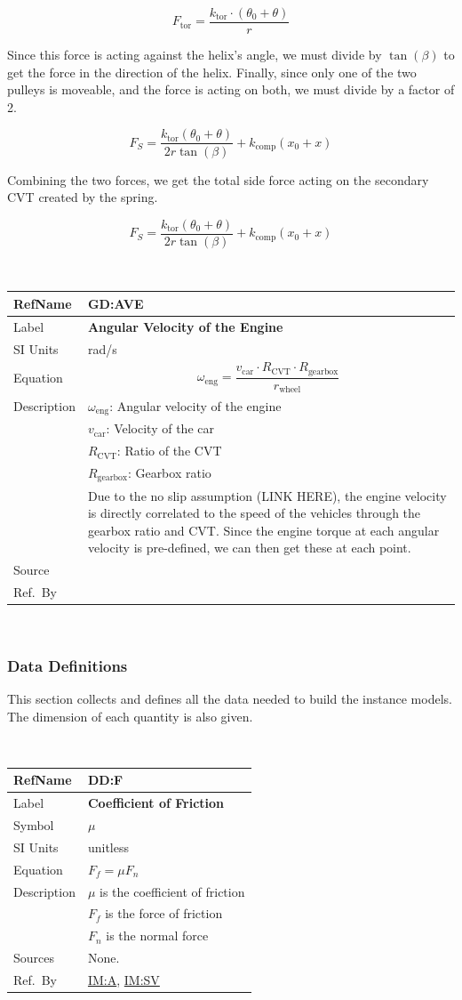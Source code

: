 \documentclass[12pt]{article}
\newcommand{\colAwidth}{0.13\textwidth}
\newcommand{\colBwidth}{0.82\textwidth}
\newcommand{\hpref}[1]{\hyperref[#1]{#1}}
\newcommand{\defgeneral}[7] {
~\newline
\noindent
\begin{minipage}{\textwidth}
\renewcommand*{\arraystretch}{1.5}
\begin{tabular}{| p{\colAwidth} | p{\colBwidth}|}
  \hline
  \rowcolor[gray]{0.9}
  RefName& \textbf{#1} \label{#1}\\
  \hline
  Label& \bf #2 \\
  \hline
  SI Units& #3\\
  \hline
  Equation& #4\\
  \hline
  Description& #5 \\
  \hline
  Source& #6 \\
  \hline
  Ref.\ By & #7\\
  \hline
\end{tabular}
\end{minipage}\\
}
\newcommand{\defdata}[8] {
~\newline
\noindent
\begin{minipage}{\textwidth}
\renewcommand*{\arraystretch}{1.5}
\begin{tabular}{| p{\colAwidth} | p{\colBwidth}|}
\hline
\rowcolor[gray]{0.9}
RefName& \textbf{#1} \label{#1}\\
\hline
Label& \bf #2\\
\hline
Symbol & #3\\
\hline
SI Units & #4\\
\hline
Equation& #5\\
\hline
Description & #6\\
\hline
Sources& #7 \\
\hline
Ref.\ By & #8\\
\hline
\end{tabular}
\end{minipage}\\
}
\begin{document}
\[ F_{\text{tor}} = \frac{k_{\text{tor}} \cdot (\theta_0 + \theta)}{r} \]

Since this force is acting against the helix's angle, we must divide by $\tan(\beta)$ to get the force in the direction of the helix. Finally, since only one of the two pulleys is moveable, and the force is acting on both, we must divide by a factor of 2.

\[ F_S = \frac{k_{\text{tor}}(\theta_0 + \theta)}{2r\tan(\beta)} + k_\text{comp}(x_0 + x) \]

Combining the two forces, we get the total side force acting on the secondary CVT created by the spring.

\[ F_S = \frac{k_{\text{tor}}(\theta_0 + \theta)}{2r\tan(\beta)} + k_\text{comp}(x_0 + x) \]

\defgeneral
{GD:AVE}
{Angular Velocity of the Engine} %
{rad/s} %
{
  \[ \omega_\text{eng} = \frac{v_\text{car} \cdot R_\text{CVT} \cdot R_\text{gearbox}}{r_\text{wheel}} \]
} %
{ 
$\omega_\text{eng}$: Angular velocity of the engine\\
& $v_\text{car}$: Velocity of the car\\
& $R_\text{CVT}$: Ratio of the CVT\\
& $R_\text{gearbox}$: Gearbox ratio\\
& Due to the no slip assumption (LINK HERE), the engine velocity is directly correlated to the speed of the vehicles through the gearbox ratio and CVT. Since the engine torque at each angular velocity is pre-defined, we can then get these at each point.
}  %
{} %
{} %

\subsubsection{Data Definitions}\label{sec_datadef}

This section collects and defines all the data needed to build the instance
models. The dimension of each quantity is also given. 

\defdata 
{DD:F} %
{Coefficient of Friction} %
{$\mu$} %
{unitless} %
{$F_f = \mu F_n$} %
{$\mu$ is the coefficient of friction\\
& $F_f$ is the force of friction\\
& $F_n$ is the normal force}%
{None.}%
{\hpref{IM:A}, \hpref{IM:SV}}%
\end{document}
